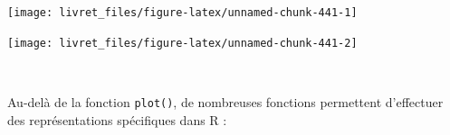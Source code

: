 \documentclass[12pt,twosided, notitlepage]{book}
\newenvironment{Shaded}{}{}
\newcommand{\KeywordTok}[1]{\textcolor[rgb]{0.00,0.00,1.00}{#1}}
\newcommand{\DataTypeTok}[1]{#1}
\newcommand{\StringTok}[1]{\textcolor[rgb]{0.00,0.50,0.50}{#1}}
\newcommand{\CommentTok}[1]{\textcolor[rgb]{0.00,0.50,0.00}{#1}}
\newcommand{\OtherTok}[1]{\textcolor[rgb]{1.00,0.25,0.00}{#1}}
\newcommand{\OperatorTok}[1]{#1}
\newcommand{\NormalTok}[1]{#1}
\renewenvironment{Shaded}{\begin{snugshade}}{\end{snugshade}}
\begin{document}
\begin{center}\texttt{[image: livret\_files/figure-latex/unnamed-chunk-441-1]} \end{center}

\begin{Shaded}
\end{Shaded}

\begin{center}\texttt{[image: livret\_files/figure-latex/unnamed-chunk-441-2]} \end{center}

~

Au-delà de la fonction \texttt{plot()}, de nombreuses fonctions
permettent d'effectuer des représentations spécifiques dans R :
\end{document}
